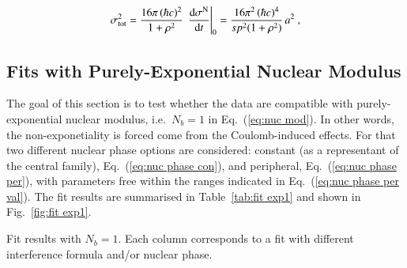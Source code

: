 \begin{equation}
\label{eq:si tot}
\sigma_{\rm tot}^2 = {16\pi\, (\hbar c)^2\over 1 + \rho^2}\, \left. \d\sigma^{\rm N}\over\d t\right|_0
		= {16\pi^2\, (\hbar c)^4\over s p^2 (1+\rho^2)}\, a^2\ ,
\end{equation}


\subsection{Fits with Purely-Exponential Nuclear Modulus}
\label{sec:fit exp1}

The goal of this section is to test whether the data are compatible with purely-exponential nuclear modulus, i.e.~$N_b=1$ in Eq.~(\ref{eq:nuc mod}). In other words, the non-exponetiality is forced come from the Coulomb-induced effects. For that two different nuclear phase options are considered: constant (as a representant of the central family), Eq.~(\ref{eq:nuc phase con}), and peripheral, Eq.~(\ref{eq:nuc phase per}), with parameters free within the ranges indicated in Eq.~(\ref{eq:nuc phase per val}). The fit results are summarised in Table~\ref{tab:fit exp1} and shown in Fig.~\ref{fig:fit exp1}.

\begin{table}
\caption{Fit results with $N_b=1$. Each column corresponds to a fit with different interference formula and/or nuclear phase. }
\vskip-3mm
\label{tab:fit exp1}
\begin{center}
\setlength\tabcolsep{2.5mm}
\small

\end{center}
\end{table}


